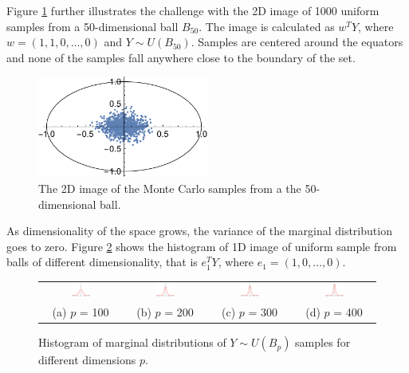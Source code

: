 \documentclass[12pt]{article}
\begin{document}
Figure \ref{fig:hd_ball} further illustrates the challenge with the 2D image of 1000 uniform samples from a 50-dimensional ball $B_{50}$. The image is calculated as $w^T Y$, where $w = (1,1,0,\ldots,0)$ and $Y \sim U(B_{50})$. Samples are centered around the equators and none of the samples fall anywhere close to the boundary of the set. 
\begin{figure}[H]
\centering
\includegraphics[width=0.5\textwidth]{hd_ball}
\caption{The 2D image of the Monte Carlo samples from a the 50-dimensional ball.}
\label{fig:hd_ball}
\end{figure}

As dimensionality of the space grows, the variance of the marginal distribution goes to zero. Figure \ref{fig:hd_hist} shows the histogram of 1D image of uniform sample from balls of different dimensionality, that is $e_1^T Y$, where $e_1 = (1,0,\ldots,0)$.
\begin{figure}[H]
\begin{tabular}{cccc}
\includegraphics[width=0.25\textwidth]{hd_hist_100}&
\includegraphics[width=0.25\textwidth]{hd_hist_200}&
\includegraphics[width=0.25\textwidth]{hd_hist_300}&
\includegraphics[width=0.25\textwidth]{hd_hist_400}\\
(a) $p$ = 100 & (b) $p$ = 200 &(c) $p$ = 300 &(d) $p$ = 400
\end{tabular}
\caption{Histogram of marginal distributions of $Y\sim U(B_p)$ samples for different dimensions $p$.}
\label{fig:hd_hist}
\end{figure}
\end{document}
